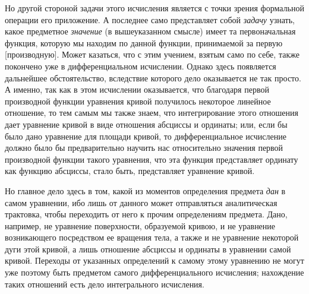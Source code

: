 Но другой стороной задачи этого исчисления является с точки зрения
формальной операции его приложение. А последнее само представляет собой
{\em задачу} узнать, какое предметное
{\em значение} (в вышеуказанном смысле) имеет та
первоначальная функция, которую мы находим по данной функции, принимаемой
за первую [производную]. Может казаться, что с этим учением, взятым само по
себе, также покончено уже в дифференциальном исчислении. Однако здесь
появляется дальнейшее обстоятельство, вследствие которого дело оказывается
не так просто. А именно, так как в этом исчислении оказывается, что
благодаря первой производной функции уравнения кривой получилось некоторое
линейное отношение, то тем самым мы также знаем, что интегрирование этого
отношения дает уравнение кривой в виде отношения абсциссы и ординаты; или,
если бы было дано уравнение для площади кривой, то дифференциальное
исчисление должно было бы предварительно научить нас относительно значения
первой производной функции такого уравнения, что эта функция представляет
ординату как функцию абсциссы, стало быть, представляет уравнение кривой.

Но главное дело здесь в том, какой из моментов определения предмета
{\em дан} в самом уравнении, ибо лишь от данного может
отправляться аналитическая трактовка, чтобы переходить от него к прочим
определениям предмета. Дано, например, не уравнение поверхности, образуемой
кривою, и не уравнение возникающего посредством ее вращения тела, а также и
не уравнение некоторой дуги этой кривой, а лишь отношение абсциссы и
ординаты в уравнении самой кривой. Переходы от указанных определений к
самому этому уравнению не могут уже поэтому быть предметом самого
дифференциального исчисления; нахождение таких отношений есть дело
интегрального исчисления.

